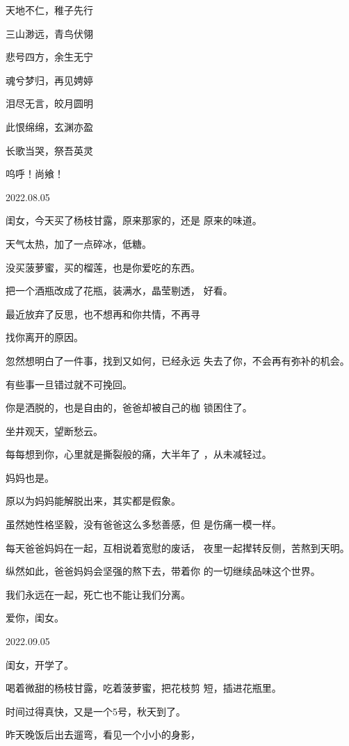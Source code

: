 \documentclass{article}
\begin{document}
天地不仁，稚子先行 


三山渺远，青鸟伏翎 


悲号四方，余生无宁 


魂兮梦归，再见娉婷 


泪尽无言，皎月圆明 

\newpage


此恨绵绵，玄渊亦盈 


长歌当哭，祭吾英灵 


呜呼！尚飨！ 



2022.08.05 

闺女，今天买了杨枝甘露，原来那家的，还是
原来的味道。 


天气太热，加了一点碎冰，低糖。 

没买菠萝蜜，买的榴莲，也是你爱吃的东西。

把一个酒瓶改成了花瓶，装满水，晶莹剔透，
好看。 

最近放弃了反思，也不想再和你共情，不再寻

\newpage
找你离开的原因。 

忽然想明白了一件事，找到又如何，已经永远
失去了你，不会再有弥补的机会。 


有些事一旦错过就不可挽回。 

你是洒脱的，也是自由的，爸爸却被自己的枷
锁困住了。 


坐井观天，望断愁云。 

每每想到你，心里就是撕裂般的痛，大半年了
，从未减轻过。 


妈妈也是。 


原以为妈妈能解脱出来，其实都是假象。 

虽然她性格坚毅，没有爸爸这么多愁善感，但
是伤痛一模一样。 

\newpage

每天爸爸妈妈在一起，互相说着宽慰的废话，
夜里一起撵转反侧，苦熬到天明。 

纵然如此，爸爸妈妈会坚强的熬下去，带着你
的一切继续品味这个世界。 


我们永远在一起，死亡也不能让我们分离。 


爱你，闺女。 



2022.09.05 


闺女，开学了。 

喝着微甜的杨枝甘露，吃着菠萝蜜，把花枝剪
短，插进花瓶里。 


时间过得真快，又是一个5号，秋天到了。 

昨天晚饭后出去遛弯，看见一个小小的身影，
\newpage
\end{document}
